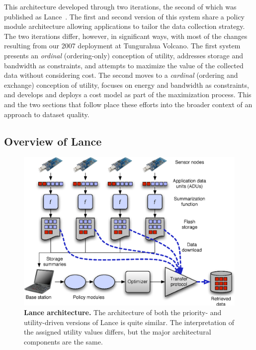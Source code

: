 This architecture developed through two iterations, the second of which was
published as Lance~\cite{lance-sensys08}.  The first and second version of
this system share a policy module architecture allowing applications to
tailor the data collection strategy. The two iterations differ, however, in
significant ways, with most of the changes resulting from our 2007 deployment
at Tungurahua Volcano.  The first system presents an \textit{ordinal}
(ordering-only) conception of utility, addresses storage and bandwidth as
constraints, and attempts to maximize the value of the collected data without
considering cost. The second moves to a \textit{cardinal} (ordering and
exchange) conception of utility, focuses on energy and bandwidth as
constraints, and develops and deploys a cost model as part of the
maximization process.  This and the two sections that follow place these
efforts into the broader context of an approach to dataset quality.

\subsection{Overview of Lance}

\begin{figure}[t!]
\begin{center}
\includegraphics[width=1.0\hsize]{./figs/Sensys2008/2008-lance-architecture.eps}
\end{center}
\caption{{\bf Lance architecture.}
The architecture of both the priority- and utility-driven versions of
Lance is quite similar. The interpretation of the assigned utility values
differs, but the major architectural components are the same.}
\label{fig-lance-architecture}
\end{figure}

